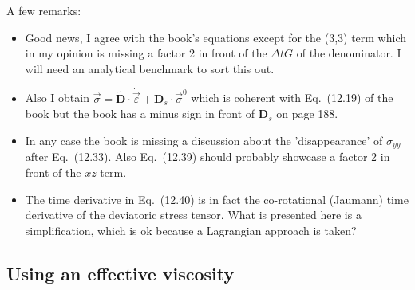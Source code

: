 A few remarks:
\begin{itemize}
\item 
Good news, I agree with the book's equations except for the (3,3)
term which in my opinion is {\color{red} missing a factor 2} in front of 
the $\Delta t G$ of the denominator.
I will need an analytical benchmark to sort this out.
\item 
Also I obtain  $\vec\sigma= \tilde{\bm D} \cdot \dot{\vec{\varepsilon}} + {\bm D}_s \cdot \vec{\sigma}^0$ which is coherent with Eq.~(12.19) of the book but the book has a minus sign in front of ${\bm D}_s$ on page 188.
\item 
In any case the book is missing a discussion about the 'disappearance' of $\sigma_{yy}$ after Eq.~(12.33).
Also Eq.~(12.39) should probably showcase a factor 2 in front of
the $xz$ term.
\item The time derivative in Eq.~(12.40) is in fact the  co-rotational (Jaumann) time derivative of the deviatoric stress tensor. What is presented here is a simplification, which is ok because a Lagrangian approach is taken?
\end{itemize}










\subsection{Using an effective viscosity}

